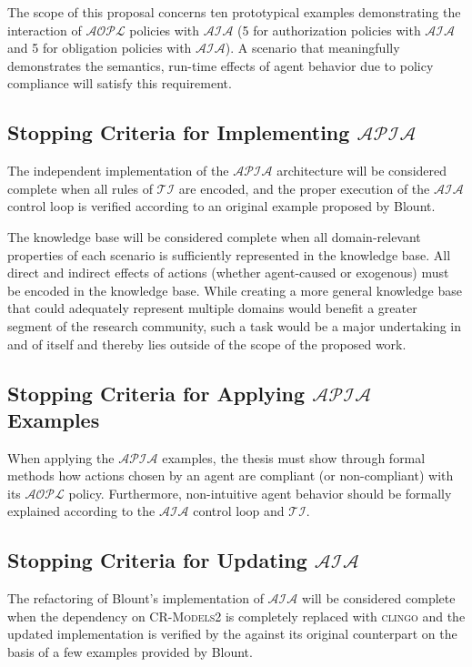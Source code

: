 The scope of this proposal concerns ten prototypical examples demonstrating the interaction of $\mathcal{AOPL}$ policies with $\mathcal{AIA}$ (5 for authorization policies with $\mathcal{AIA}$ and 5 for obligation policies with $\mathcal{AIA}$).
A scenario that meaningfully demonstrates the semantics, run-time effects of agent behavior due to policy compliance will satisfy this requirement.

\subsection{Stopping Criteria for Implementing $\mathcal{APIA}$}

The independent implementation of the $\mathcal{APIA}$ architecture will be considered complete when all rules of $\mathcal{TI}$ are encoded, and the proper execution of the $\mathcal{AIA}$ control loop is verified according to an original example proposed by Blount.

The knowledge base will be considered complete when all domain-relevant properties of each scenario is sufficiently represented in the knowledge base.
All direct and indirect effects of actions (whether agent-caused or exogenous) must be encoded in the knowledge base.
While creating a more general knowledge base that could adequately represent multiple domains would benefit a greater segment of the research community, such a task would be a major undertaking in and of itself and thereby lies outside of the scope of the proposed work.

\subsection{Stopping Criteria for Applying $\mathcal{APIA}$ Examples}

When applying the $\mathcal{APIA}$ examples, the thesis must show through formal methods how actions chosen by an agent are compliant (or non-compliant) with its $\mathcal{AOPL}$ policy.
Furthermore, non-intuitive agent behavior should be formally explained according to the $\mathcal{AIA}$ control loop and $\mathcal{TI}$.

\subsection{Stopping Criteria for Updating $\mathcal{AIA}$}

The refactoring of Blount's implementation of $\mathcal{AIA}$ will be considered complete when the dependency on \textsc{CR-Models2} is completely replaced with \textsc{clingo} and the updated implementation is verified by the against its original counterpart on the basis of a few examples provided by Blount.

